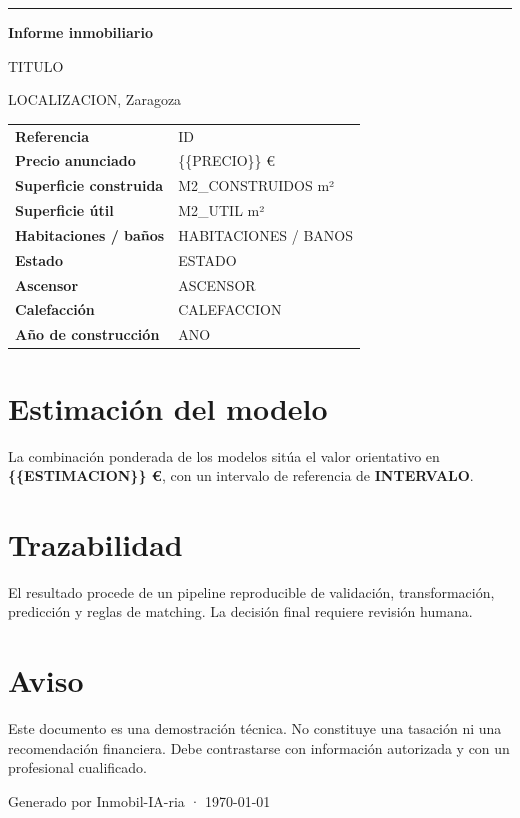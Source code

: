 \documentclass[11pt,a4paper]{article}
\begin{document}
{\color{teal}\rule{\textwidth}{3pt}}

{\Huge\bfseries\color{navy} Informe inmobiliario}\par
{\Large {{TITULO}}}\par
{\color{teal}\large {{LOCALIZACION}}, Zaragoza}

\vspace{0.8cm}
\begin{tabular}{@{}p{}p{}@{}}
\toprule
\rowcolor{soft}
\textbf{Referencia} & {{ID}} \\
\textbf{Precio anunciado} & \num{{{PRECIO}}} € \\
\rowcolor{soft}
\textbf{Superficie construida} & {{M2_CONSTRUIDOS}} m² \\
\textbf{Superficie útil} & {{M2_UTIL}} m² \\
\rowcolor{soft}
\textbf{Habitaciones / baños} & {{HABITACIONES}} / {{BANOS}} \\
\textbf{Estado} & {{ESTADO}} \\
\rowcolor{soft}
\textbf{Ascensor} & {{ASCENSOR}} \\
\textbf{Calefacción} & {{CALEFACCION}} \\
\rowcolor{soft}
\textbf{Año de construcción} & {{ANO}} \\
\bottomrule
\end{tabular}

\section*{Estimación del modelo}

La combinación ponderada de los modelos sitúa el valor orientativo en
\textbf{\num{{{ESTIMACION}}} €}, con un intervalo de referencia de
\textbf{{{INTERVALO}}}.

\section*{Trazabilidad}

El resultado procede de un pipeline reproducible de validación, transformación,
predicción y reglas de matching. La decisión final requiere revisión humana.

\section*{Aviso}

Este documento es una demostración técnica. No constituye una tasación ni una
recomendación financiera. Debe contrastarse con información autorizada y con un
profesional cualificado.

\vfill
{\small\color{navy}Generado por Inmobil-IA-ria · \today}
\end{document}
